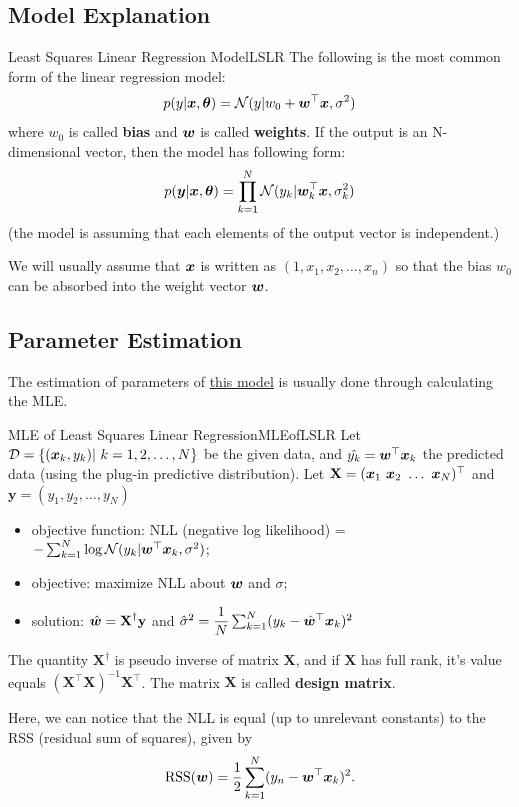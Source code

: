 \documentclass{report}
\begin{document}
        \subsection{Model Explanation}
            \begin{defn}{Least Squares Linear Regression Model}{LSLR}
                The following is the most common form of the linear regression model:
                \[
                p(y|\boldsymbol{x}, \boldsymbol{\theta}) = \mathcal{N}(y|w_0+\boldsymbol{w}^\top \boldsymbol{x}, \sigma^2)
                \]
                where $w_0$ is called \textbf{bias} and $\boldsymbol{w}$ is called \textbf{weights}. If the output is an N-dimensional vector, then the model has following form:
                \[ 
                p(\boldsymbol{y}|\boldsymbol{x}, \boldsymbol{\theta}) = \prod_{k=1}^{N}\mathcal{N}(y_k|\boldsymbol{w}_k^\top\boldsymbol{x}, \sigma_{k}^{2})
                \]
                (the model is assuming that each elements of the output vector is independent.)
            \end{defn}

            We will usually assume that $\boldsymbol{x}$ is written as $(1, x_1, x_2, \ldots, x_n)$ so that the bias $w_0$ can be absorbed into the weight vector $\boldsymbol{w}$.

        \subsection{Parameter Estimation}
            The estimation of parameters of \hyperref[defn:LSLR]{this model} is usually done through calculating the MLE.

            \begin{thm}{MLE of Least Squares Linear Regression}{MLEofLSLR}
                Let $\mathcal D=\{(\boldsymbol{x}_k, y_k)|\ k=1,2,\ldots,N\}$ be the given data, and $\hat{y_k}=\boldsymbol{w}^\top \boldsymbol{x}_k$ the predicted data (using the plug-in predictive distribution).
                Let $\textbf{X}=(\bs{x}_1 \ \bs{x}_2 \ \ldots \ \bs{x}_N)^\top$ and $\textbf{y}=(y_1,y_2,\ldots,y_N)$
                \begin{itemize}
                    \item objective function: NLL (negative log likelihood) = $-\sum_{k=1}^{N}\log{\mathcal N(y_k|\boldsymbol{w}^\top \boldsymbol{x}_k, \sigma^2)}$;
                    \item objective: maximize NLL about $\boldsymbol{w}$ and $\sigma$;
                    \item solution: $\hat{\boldsymbol{w}}=\textbf{X}^{\dagger}\textbf{y}$ 
                    and $\hat{\sigma}^2=\dfrac{1}{N}\sum_{k=1}^{N}(y_k-\hat{\boldsymbol{w}}^{\top}\boldsymbol{x}_k)^2$
                \end{itemize}
                The quantity $\textbf{X}^{\dagger}$
                is pseudo inverse of matrix $\textbf{X}$, and if $\textbf{X}$ has full rank, it's value equals
                $(\textbf{X}^{\top}\textbf{X})^{-1}\textbf{X}^{\top}$.
                The matrix $\textbf{X}$ is called \textbf{design matrix}.
            \end{thm}
            Here, we can notice that the NLL is equal (up to unrelevant constants) to the RSS (residual sum of squares), given by
            \[
            \text{RSS}(\boldsymbol{w}) = \frac{1}{2} \sum_{k=1}^{N}(y_n - \boldsymbol{w}^{\top}\boldsymbol{x}_k)^2.
            \]
\end{document}

